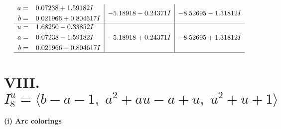 \documentclass[1p]{elsarticle_modified}
\theoremstyle{definition}
\begin{document}
$$\begin{array}{c|c|c}
\begin{aligned}
a &= \phantom{-}0.07238 + 1.59182 I \\
b &= \phantom{-}0.021966 + 0.804617 I\end{aligned}
 & -5.18918 - 0.24371 I & -8.52695 - 1.31812 I \\ \hline\begin{aligned}
u &= \phantom{-}1.68250 - 0.33852 I \\
a &= \phantom{-}0.07238 - 1.59182 I \\
b &= \phantom{-}0.021966 - 0.804617 I\end{aligned}
 & -5.18918 + 0.24371 I & -8.52695 + 1.31812 I\\
 \hline 
 \end{array}$$\newpage\newpage\renewcommand{\arraystretch}{1}
\centering \section*{VIII. $I^u_{8}= \langle b- a-1,\;a^2+a u- a+u,\;u^2+u+1 \rangle$}
\flushleft \textbf{(i) Arc colorings}\\
\end{document}
